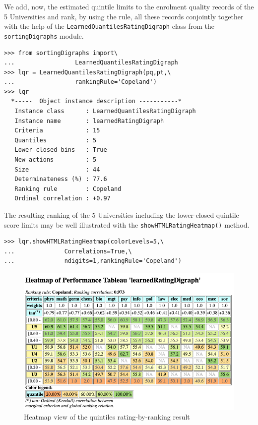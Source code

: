 We add, now, the estimated quintile limits to the enrolment quality records of the 5 Universities and rank, by using the \Copeland rule, all these records conjointly together with the help of the \texttt{LearnedQuantilesRatingDigraph} class from the \texttt{sortingDigraphs} module.
\begin{lstlisting}
>>> from sortingDigraphs import\
...                 LearnedQuantilesRatingDigraph
>>> lqr = LearnedQuantilesRatingDigraph(pq,pt,\
...                 rankingRule='Copeland')
>>> lqr
  *-----  Object instance description -----------*
   Instance class      : LearnedQuantilesRatingDigraph
   Instance name       : learnedRatingDigraph
   Criteria            : 15
   Quantiles           : 5
   Lower-closed bins   : True
   New actions         : 5
   Size                : 44
   Determinateness (%) : 77.6
   Ranking rule        : Copeland
   Ordinal correlation : +0.97
\end{lstlisting}

The resulting ranking of the 5 Universities including the lower-closed quintile score limits may be well illustrated  with the \texttt{showHTMLRatingHeatmap()} method.
\begin{lstlisting}
>>> lqr.showHTMLRatingHeatmap(colorLevels=5,\
...              Correlations=True,\
...              ndigits=1,rankingRule='Copeland')
\end{lstlisting}
\begin{figure}[ht]
\includegraphics[width=\hsize]{Figures/14-3-quintilingResult.png}
\caption{Heatmap view of the quintiles rating-by-ranking result}
\label{fig:14.3}       %
\end{figure}

